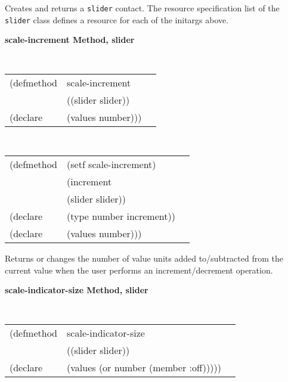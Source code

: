 \begin{flushright} \parbox[t]{6.125in}{
Creates and returns a {\tt slider} contact.
The resource specification list of the {\tt slider} class defines
a resource for each of the initargs above.


}\end{flushright}





{\samepage  
{\large {\bf scale-increment \hfill Method, slider}}
\begin{flushright} \parbox[t]{6.125in}{
\tt
\begin{tabular}{lll}
\raggedright
(defmethod & scale-increment & \\
& ((slider  slider)) \\
(declare & (values number)))
\end{tabular}
\rm

}\end{flushright}}

\begin{flushright} \parbox[t]{6.125in}{
\tt
\begin{tabular}{lll}
\raggedright
(defmethod & (setf scale-increment) & \\
         & (increment \\
         & (slider  slider)) \\
(declare &(type number  increment))\\
(declare & (values number)))
\end{tabular}
\rm}
\end{flushright}

\begin{flushright} \parbox[t]{6.125in}{
Returns or changes the number of value units added to/subtracted from the
current value when the user performs an increment/decrement operation.}

\end{flushright}


{\samepage  
{\large {\bf scale-indicator-size \hfill Method, slider}}
\begin{flushright} \parbox[t]{6.125in}{
\tt
\begin{tabular}{lll}
\raggedright
(defmethod & scale-indicator-size & \\
& ((slider  slider)) \\
(declare & (values (or number (member :off)))))
\end{tabular}
\rm

}\end{flushright}}

